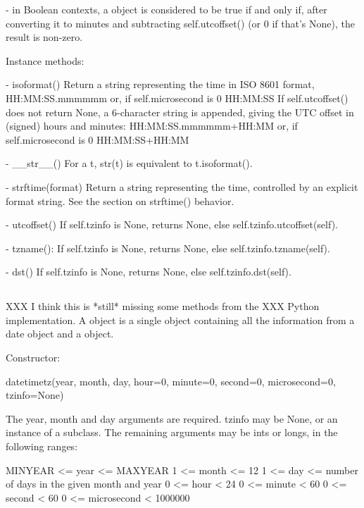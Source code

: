 {    - in Boolean contexts, a  object is considered to be true
      if and only if, after converting it to minutes and subtracting
      self.utcoffset() (or 0 if that's None), the result is non-zero.

Instance methods:

  - isoformat()
    Return a string representing the time in ISO 8601 format,
        HH:MM:SS.mmmmmm
    or, if self.microsecond is 0
        HH:MM:SS
    If self.utcoffset() does not return None, a 6-character string is
    appended, giving the UTC offset in (signed) hours and minutes:
        HH:MM:SS.mmmmmm+HH:MM
    or, if self.microsecond is 0
        HH:MM:SS+HH:MM

  - __str__()
    For a  t, str(t) is equivalent to t.isoformat().

  - strftime(format)
    Return a string representing the time, controlled by an explicit
    format string.  See the section on strftime() behavior.

  - utcoffset()
    If self.tzinfo is None, returns None, else self.tzinfo.utcoffset(self).

  - tzname():
    If self.tzinfo is None, returns None, else self.tzinfo.tzname(self).

  - dst()
    If self.tzinfo is None, returns None, else self.tzinfo.dst(self).



\subsection{   \label{datetime-datetimetz}}

XXX I think this is *still* missing some methods from the
XXX Python implementation.
A  object is a single object containing all the information
from a date object and a  object.

Constructor:

    datetimetz(year, month, day,
               hour=0, minute=0, second=0, microsecond=0, tzinfo=None)

    The year, month and day arguments are required.  tzinfo may be None,
    or an instance of a  subclass.  The remaining arguments may be
    ints or longs, in the following ranges:

        MINYEAR <= year <= MAXYEAR
        1 <= month <= 12
        1 <= day <= number of days in the given month and year
        0 <= hour < 24
        0 <= minute < 60
        0 <= second < 60
        0 <= microsecond < 1000000

}
